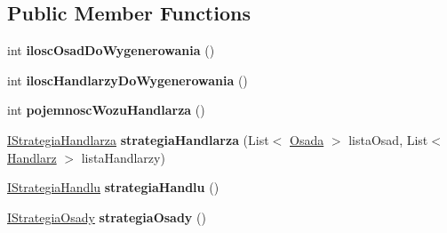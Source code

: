 \subsection*{Public Member Functions}
\begin{DoxyCompactItemize}
\item 
\hypertarget{interface_empire___simulator_1_1_i_strategia_generowania_swiata_ae12937c8cec1dd6cfb64be80ef07ebff}{int {\bfseries ilosc\+Osad\+Do\+Wygenerowania} ()}\label{interface_empire___simulator_1_1_i_strategia_generowania_swiata_ae12937c8cec1dd6cfb64be80ef07ebff}

\item 
\hypertarget{interface_empire___simulator_1_1_i_strategia_generowania_swiata_a8145d4a98b2395911e7bb4d85384b284}{int {\bfseries ilosc\+Handlarzy\+Do\+Wygenerowania} ()}\label{interface_empire___simulator_1_1_i_strategia_generowania_swiata_a8145d4a98b2395911e7bb4d85384b284}

\item 
\hypertarget{interface_empire___simulator_1_1_i_strategia_generowania_swiata_aa37c357c667724f86037976d00da07cc}{int {\bfseries pojemnosc\+Wozu\+Handlarza} ()}\label{interface_empire___simulator_1_1_i_strategia_generowania_swiata_aa37c357c667724f86037976d00da07cc}

\item 
\hypertarget{interface_empire___simulator_1_1_i_strategia_generowania_swiata_a1170bcc5bb31bdda8f2be28d7c69cc1b}{\hyperlink{interface_empire___simulator_1_1_i_strategia_handlarza}{I\+Strategia\+Handlarza} {\bfseries strategia\+Handlarza} (List$<$ \hyperlink{class_empire___simulator_1_1_osada}{Osada} $>$ lista\+Osad, List$<$ \hyperlink{class_empire___simulator_1_1_handlarz}{Handlarz} $>$ lista\+Handlarzy)}\label{interface_empire___simulator_1_1_i_strategia_generowania_swiata_a1170bcc5bb31bdda8f2be28d7c69cc1b}

\item 
\hypertarget{interface_empire___simulator_1_1_i_strategia_generowania_swiata_ae2d930bea01b0777b605749cad794dcc}{\hyperlink{interface_empire___simulator_1_1_i_strategia_handlu}{I\+Strategia\+Handlu} {\bfseries strategia\+Handlu} ()}\label{interface_empire___simulator_1_1_i_strategia_generowania_swiata_ae2d930bea01b0777b605749cad794dcc}

\item 
\hypertarget{interface_empire___simulator_1_1_i_strategia_generowania_swiata_abc39873591ff95bde54ba028e9c7f55b}{\hyperlink{interface_empire___simulator_1_1_i_strategia_osady}{I\+Strategia\+Osady} {\bfseries strategia\+Osady} ()}\label{interface_empire___simulator_1_1_i_strategia_generowania_swiata_abc39873591ff95bde54ba028e9c7f55b}

\end{DoxyCompactItemize}


